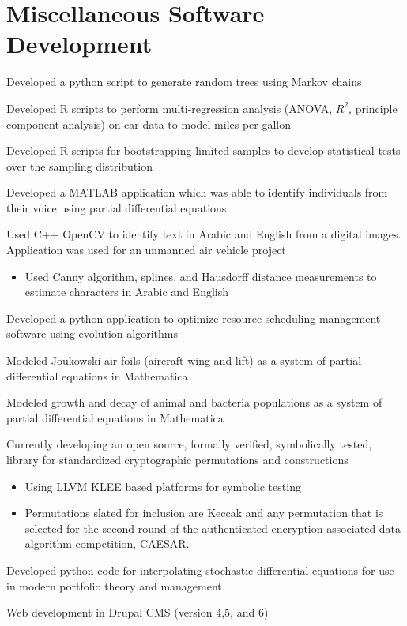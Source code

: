 \documentclass[letterpaper]{clinton-resume}
\begin{document}
\begin{minipage}[t]{0.66\textwidth}
\section{Miscellaneous Software Development}
\vspace{\topsep}
\begin{tightitemize}
\item Developed a python script to generate random trees using Markov chains
\item Developed R scripts to perform multi-regression analysis (ANOVA, $R^2$, principle component analysis)  on car data to model miles per gallon
\item Developed R scripts for bootstrapping limited samples to develop statistical tests over the sampling distribution
\item Developed a MATLAB application which was able to identify individuals from their voice using partial differential equations
\item Used C++ OpenCV to identify text in Arabic and English from a digital images.  Application was used for an unmanned air vehicle project
\begin{itemize}
\item Used Canny algorithm, splines, and Hausdorff distance measurements to estimate characters in Arabic and English
\end{itemize}
\item Developed a python application to optimize resource scheduling management software using evolution algorithms
\item Modeled Joukowski air foils (aircraft wing and lift) as a system of partial differential equations in Mathematica
\item Modeled growth and decay of animal and bacteria populations as a system of partial differential equations in Mathematica
\end{tightitemize}
\vspace{\topsep}
\begin{tightitemize}
\item Currently developing an open source, formally verified, symbolically tested, library for standardized cryptographic permutations and constructions
	\begin{itemize}
	\item Using LLVM KLEE based platforms for symbolic testing
	\item Permutations slated for inclusion are Keccak and any permutation that is selected for the second round of the authenticated encryption associated data algorithm competition, CAESAR.
	\end{itemize}
\item Developed python code for interpolating stochastic differential equations for use in modern portfolio theory and management
\item Web development in Drupal CMS (version 4,5, and 6)
\end{tightitemize}
\end{minipage}
\end{document}

